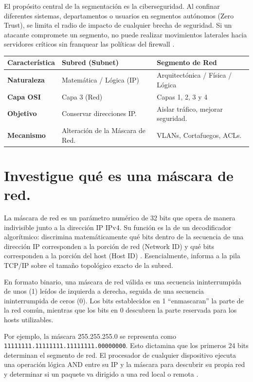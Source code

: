 \documentclass[a4paper,12pt]{article}
\begin{document}
El propósito central de la segmentación es la ciberseguridad. Al confinar diferentes sistemas, departamentos o usuarios en segmentos autónomos (Zero Trust), se limita el radio de impacto de cualquier brecha de seguridad. Si un atacante compromete un segmento, no puede realizar movimientos laterales hacia servidores críticos sin franquear las políticas del firewall \cite{zscaler_segmentation}.

\begin{table}[H]
\centering
\begin{tabular}{|p{3.5cm}|p{5.5cm}|p{5.5cm}|}
\hline
\textbf{Característica} & \textbf{Subred (Subnet)} & \textbf{Segmento de Red} \\ \hline
\textbf{Naturaleza} & Matemática / Lógica (IP) & Arquitectónica / Física / Lógica \\ \hline
\textbf{Capa OSI} & Capa 3 (Red) & Capas 1, 2, 3 y 4 \\ \hline
\textbf{Objetivo} & Conservar direcciones IP. & Aislar tráfico, mejorar seguridad. \\ \hline
\textbf{Mecanismo} & Alteración de la Máscara de Red. & VLANs, Cortafuegos, ACLs. \\ \hline
\end{tabular}
\end{table}

\newpage

\section{Investigue qué es una máscara de red.}

La máscara de red es un parámetro numérico de 32 bits que opera de manera indivisible junto a la dirección IP IPv4. Su función es la de un decodificador algorítmico: discrimina matemáticamente qué bits dentro de la secuencia de una dirección IP corresponden a la porción de red (Network ID) y qué bits corresponden a la porción del host (Host ID) \cite{lenovo_netmask}. Esencialmente, informa a la pila TCP/IP sobre el tamaño topológico exacto de la subred.

En formato binario, una máscara de red válida es una secuencia ininterrumpida de unos (1) leídos de izquierda a derecha, seguida de una secuencia ininterrumpida de ceros (0). Los bits establecidos en 1 ``enmascaran'' la parte de la red común, mientras que los bits en 0 descubren la parte reservada para los hosts utilizables. 

Por ejemplo, la máscara 255.255.255.0 se representa como \texttt{11111111.11111111.11111111.00000000}. Esto dictamina que los primeros 24 bits determinan el segmento de red. El procesador de cualquier dispositivo ejecuta una operación lógica AND entre su IP y la máscara para descubrir su propia red y determinar si un paquete va dirigido a una red local o remota \cite{tmobile_subnet}.
\end{document}
